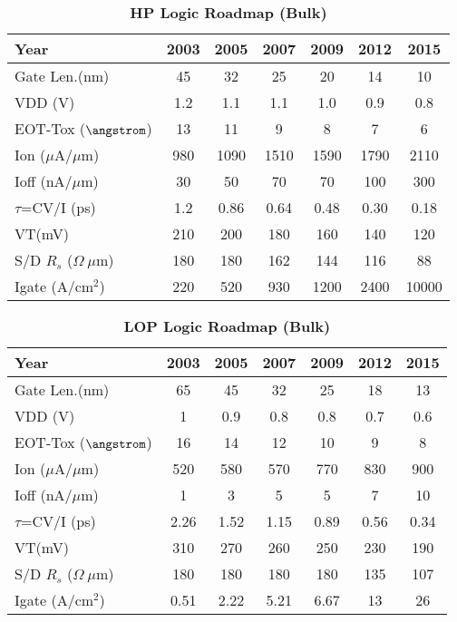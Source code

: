 \documentclass[a4paper, 12pt, twoside, openright]{report}
\begin{document}
 
   \begin{table}[h]
   \centering
     \begin{tabular}{||l||c|c|c|c|c|c||}\hline
      Year          & 2003 & 2005 & 2007 & 2009 & 2012 & 2015\\
      \hline
             
      Gate Len.(nm)  &45 &32 &25  &20  &14  &10\\ %
      \hline
      VDD (V)  &1.2  &1.1 &1.1 &1.0 &0.9 &0.8\\
      \hline
      EOT-Tox ($\angstrom$) &13 &11 &9 &8 &7 &6\\
      \hline
      {Ion} ($\mu$A/$\mu$m)  &980  &1090 &1510 &1590 &1790 &2110\\
      \hline
      {Ioff} (nA/$\mu$m)  &30 &50 &70 &70  &100  &300\\
      \hline
      {$\tau$=CV/I} (ps)  &1.2 &0.86 &0.64 &0.48 &0.30 &0.18\\
      \hline
      VT(mV)   &210  &200 &180 &160 &140 &120\\
      \hline
      S/D $R_s$ ($\Omega~\mu$m)   &180 &180 &162 &144 &116 &88\\
      \hline
      Igate (A/cm$^2$)   &220 &520 &930 &1200 &2400 &10000\\
      \hline
     \end{tabular}
     \caption{\textbf{HP Logic Roadmap (Bulk)}}
   \end{table}

  
   \begin{table}[H]
     \centering
     \begin{tabular}{||l||c|c|c|c|c|c||}\hline
      Year          & 2003 & 2005 & 2007 & 2009 & 2012 & 2015\\
    
      \hline       
      Gate Len.(nm)  &65  &45  &32  &25  &18  &13\\ 
      \hline
      VDD (V)  &1  &0.9 &0.8  &0.8  &0.7 &0.6\\
      \hline
      EOT-Tox ($\angstrom$) &16 &14 &12 &10 &9 &8\\
      \hline
        {Ion} ($\mu$A/$\mu$m)  &520  &580 &570 &770 &830 &900\\
      \hline
        {Ioff} (nA/$\mu$m)  &1 &3 &5 &5  &7 &10\\
      \hline
        {$\tau$=CV/I} (ps)  &2.26  &1.52  &1.15 &0.89 &0.56 &0.34\\
      \hline
      VT(mV)   &310  &270 &260 &250 &230 &190\\
      \hline
      S/D $R_s$ ($\Omega~\mu$m)   &180 &180 &180 &180 &135 &107\\
      \hline
      Igate (A/cm$^2$)   &0.51 &2.22 &5.21 &6.67 &13 &26\\
      \hline
     \end{tabular}
     
   \caption{\textbf{LOP Logic Roadmap (Bulk)}}

   \end{table}
 
\end{document}

